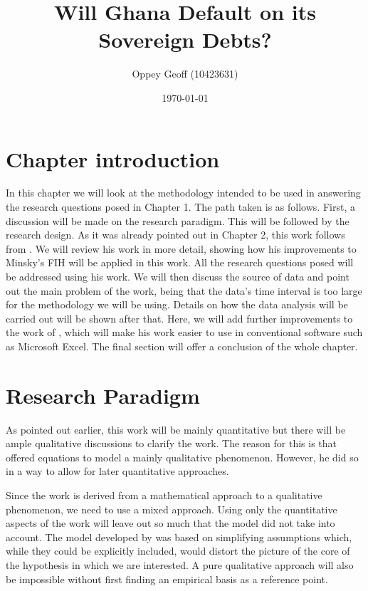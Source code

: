 \documentclass[a4paper, 12pt]{article}
\author{Oppey Geoff (10423631)}
\title{Will Ghana Default on its Sovereign Debts?}
\date{\today}
\begin{document}
	\maketitle
	\clearpage
	\tableofcontents
	\newpage
	\newpage
	\doublespacing
	\section{Chapter introduction}
	In this chapter we will look at the methodology intended to be used in answering the research questions posed in Chapter 1. The path taken is as follows. First, a discussion will be made on the research paradigm. This will be followed by the research design. As it was already pointed out in Chapter 2, this work follows from . We will review his work in more detail, showing how his improvements to Minsky's FIH will be applied in this work. All the research questions posed will be addressed using his work. We will then discuss the source of data and point out the main problem of the work, being that the data's time interval is too large for the methodology we will be using. Details on how the data analysis will be carried out will be shown after that. Here, we will add further improvements to the work of , which will make his work easier to use in conventional software such as Microsoft Excel. The final section will offer a conclusion of the whole chapter.
	\section{Research Paradigm}
	As pointed out earlier, this work will be mainly quantitative but there will be ample qualitative discussions to clarify the work. The reason for this is that  offered equations to model a mainly qualitative phenomenon. However, he did so in a way to allow for later quantitative approaches. 
	
	Since the work is derived from a mathematical approach to a qualitative phenomenon, we need to use a mixed approach. Using only the quantitative aspects of the work will leave out so much that the model did not take into account. The model developed by  was based on simplifying assumptions which, while they could be explicitly included, would distort the picture of the core of the hypothesis in which we are interested. A pure qualitative approach will also be impossible without first finding an empirical basis as a reference point.
	
\end{document}
